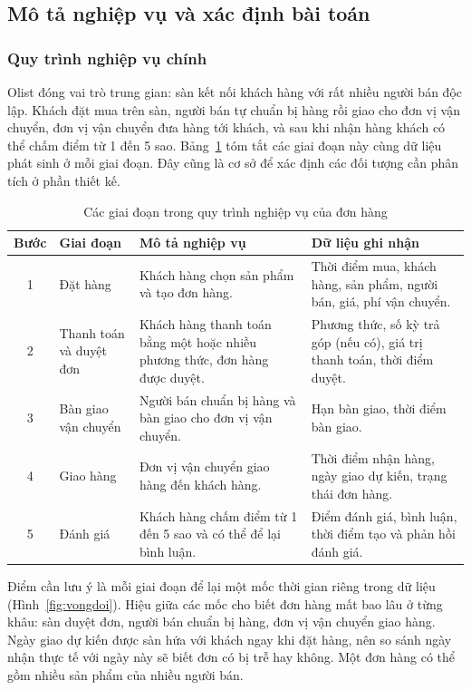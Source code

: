 \subsection{Mô tả nghiệp vụ và xác định bài toán}

\subsubsection{Quy trình nghiệp vụ chính}

Olist đóng vai trò trung gian: sàn kết nối khách hàng với rất nhiều người bán độc lập. Khách đặt mua trên sàn, người bán tự chuẩn bị hàng rồi giao cho đơn vị vận chuyển, đơn vị vận chuyển đưa hàng tới khách, và sau khi nhận hàng khách có thể chấm điểm từ 1 đến 5 sao. Bảng~\ref{tab:quytrinh} tóm tắt các giai đoạn này cùng dữ liệu phát sinh ở mỗi giai đoạn. Đây cũng là cơ sở để xác định các đối tượng cần phân tích ở phần thiết kế.

\begin{table}[H]
\centering
\small{}
\caption{Các giai đoạn trong quy trình nghiệp vụ của đơn hàng}
\label{tab:quytrinh}
\begin{tabularx}{\linewidth}{|c|p{3cm}|X|p{5.1cm}|}
\hline
\textbf{Bước} & \textbf{Giai đoạn} & \textbf{Mô tả nghiệp vụ} & \textbf{Dữ liệu ghi nhận}\\ \hline
1 & Đặt hàng & Khách hàng chọn sản phẩm và tạo đơn hàng. & Thời điểm mua, khách hàng, sản phẩm, người bán, giá, phí vận chuyển.\\ \hline
2 & Thanh toán và duyệt đơn & Khách hàng thanh toán bằng một hoặc nhiều phương thức, đơn hàng được duyệt. & Phương thức, số kỳ trả góp (nếu có), giá trị thanh toán, thời điểm duyệt.\\ \hline
3 & Bàn giao vận chuyển & Người bán chuẩn bị hàng và bàn giao cho đơn vị vận chuyển. & Hạn bàn giao, thời điểm bàn giao.\\ \hline
4 & Giao hàng & Đơn vị vận chuyển giao hàng đến khách hàng. & Thời điểm nhận hàng, ngày giao dự kiến, trạng thái đơn hàng.\\ \hline
5 & Đánh giá & Khách hàng chấm điểm từ 1 đến 5 sao và có thể để lại bình luận. & Điểm đánh giá, bình luận, thời điểm tạo và phản hồi đánh giá.\\ \hline
\end{tabularx}
\end{table}

Điểm cần lưu ý là mỗi giai đoạn để lại một mốc thời gian riêng trong dữ liệu (Hình~\ref{fig:vongdoi}). Hiệu giữa các mốc cho biết đơn hàng mất bao lâu ở từng khâu: sàn duyệt đơn, người bán chuẩn bị hàng, đơn vị vận chuyển giao hàng. Ngày giao dự kiến được sàn hứa với khách ngay khi đặt hàng, nên so sánh ngày nhận thực tế với ngày này sẽ biết đơn có bị trễ hay không. Một đơn hàng có thể gồm nhiều sản phẩm của nhiều người bán.

